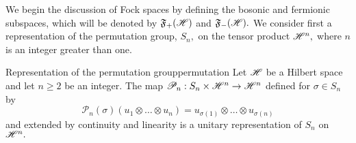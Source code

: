 We begin the discussion of Fock spaces by defining the bosonic and fermionic subspaces, which will be denoted by \(\mathfrak{F}_+(\mathscr{H})\) and \(\mathfrak{F}_-(\mathscr{H}).\) We consider first a representation of the permutation group, \(S_n,\) on the tensor product \(\mathscr{H}^n,\) where \(n\) is an integer greater than one.
\begin{proposition}{Representation of the permutation group}{permutation}
    Let \(\mathscr{H}\) be a Hilbert space and let \(n \geq 2\) be an integer. The map \(\mathscr{P}_n : S_n \times \mathscr{H}^n \to \mathscr{H}^n\) defined for \(\sigma \in S_n\) by
    \begin{equation*}
        \mathscr{P}_n(\sigma)\left(u_1 \otimes \dots \otimes u_n\right) = u_{\sigma(1)} \otimes \dots \otimes u_{\sigma(n)}
    \end{equation*}
    and extended by continuity and linearity is a unitary representation of \(S_n\) on \(\mathscr{H}^n.\)
\end{proposition}
